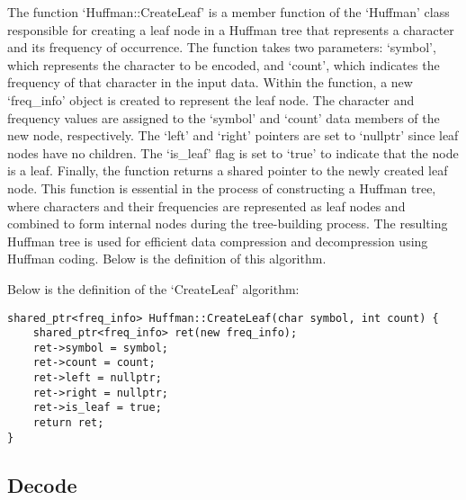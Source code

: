The function `Huffman::CreateLeaf' is a member function of the `Huffman' class responsible for creating a leaf node in a Huffman tree that represents a character and its frequency of occurrence. 
The function takes two parameters: `symbol', which represents the character to be encoded, and `count', which indicates the frequency of that character in the input data. Within the function, a 
new `freq\_info' object is created to represent the leaf node. The character and frequency values are assigned to the `symbol' and `count' data members of the new node, respectively. The `left' 
and `right' pointers are set to `nullptr' since leaf nodes have no children. The `is\_leaf' flag is set to `true' to indicate that the node is a leaf. Finally, the function returns a shared 
pointer to the newly created leaf node. This function is essential in the process of constructing a Huffman tree, where characters and their frequencies are represented as leaf nodes and combined 
to form internal nodes during the tree-building process. The resulting Huffman tree is used for efficient data compression and decompression using Huffman coding. Below is the definition of this
algorithm.

\begin{highlight}

Below is the definition of the `CreateLeaf' algorithm:

\horizontalline

\begin{verbatim}
shared_ptr<freq_info> Huffman::CreateLeaf(char symbol, int count) {
    shared_ptr<freq_info> ret(new freq_info);
    ret->symbol = symbol;
    ret->count = count;
    ret->left = nullptr;
    ret->right = nullptr;
    ret->is_leaf = true;
    return ret;
}
\end{verbatim}

\end{highlight}

\subsection*{Decode}

